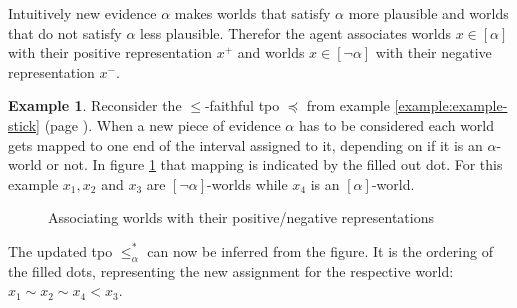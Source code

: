 \documentclass[english, 12pt]{scrartcl}
\theoremstyle{definition}
\newtheorem{example}{Example}[section]
\theoremstyle{definition}
\theoremstyle{definition}
\begin{document}
Intuitively new evidence $\alpha$ makes worlds that satisfy $\alpha$ more plausible and worlds that do not satisfy $\alpha$ less plausible. Therefor the agent associates worlds $x \in [\alpha]$ with their positive representation $x^{+}$ and worlds $x \in [\neg\alpha]$ with their negative representation $x^{-}$.

\begin{example}
    \label{example:example-updated-tpo}
    Reconsider the $\leq$-faithful tpo $\preceq$ from example \ref{example:example-stick} (page \pageref{example:example-stick}). When a new piece of evidence $\alpha$ has to be considered each world gets mapped to one end of the interval assigned to it, depending on if it is an $\alpha$-world or not. In figure \ref{fig:example-updated-tpo} that mapping is indicated by the filled out dot. For this example $x_{1}, x_{2}$ and $x_{3}$ are $[\neg\alpha]$-worlds while $x_{4}$ is an $[\alpha]$-world.

    \begin{figure}[h]
        \centering
        \caption{Associating worlds with their positive/negative representations}
        \label{fig:example-updated-tpo}
    \end{figure}
    
    The updated tpo $\leq_{\alpha}^{\ast}$ can now be inferred from the figure. It is the ordering of the filled dots, representing the new assignment for the respective world: $x_{1} \sim x_{2} \sim x_{4} < x_{3}$.
\end{example}
\end{document}
